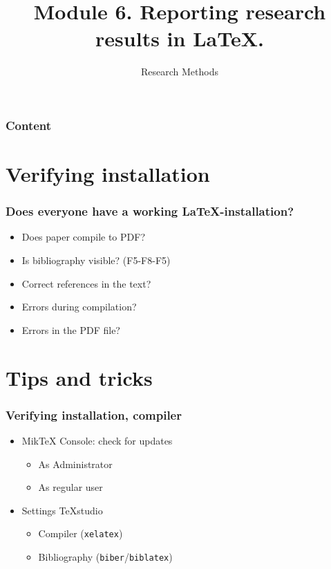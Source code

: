 \documentclass[aspectratio=169]{beamer}
\title{Module 6. Reporting research results in \LaTeX{}.}
\subtitle{Research Methods}
\author{\lecturers}   %
\date{\academicyear}
\begin{document}
\begin{frame}
  \maketitle
\end{frame}

\begin{frame}
  \frametitle{Content}

  \tableofcontents
\end{frame}

\section{Verifying installation}

\begin{frame}
  \frametitle{Does everyone have a working {\LaTeX}-installation?}

  \begin{itemize}
   \item Does paper compile to PDF?
   \item Is bibliography visible? (F5-F8-F5)
   \item Correct references in the text?
   \item Errors during compilation?
   \item Errors in the PDF file?
  \end{itemize}

\end{frame}

\section{Tips and tricks}


\begin{frame}
  \frametitle{Verifying installation, compiler}

  \begin{itemize}
    \item Mik{\TeX} Console: check for updates
          \begin{itemize}
            \item As Administrator
            \item As regular user
          \end{itemize}
    \item Settings TeXstudio
          \begin{itemize}
            \item Compiler (\texttt{xelatex})
            \item Bibliography (\texttt{biber}/\texttt{biblatex})
          \end{itemize}
  \end{itemize}

\end{frame}
\end{document}

